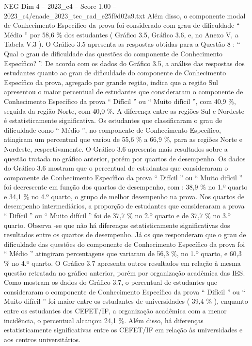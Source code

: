 \begin{textsample}{NEG Dim 4 – 2023\_c4 – Score 1.00 – 2023\_c4/enade\_2023\_tec\_rad\_e25f9d02a9.txt}
Além disso, o componente modal de Conhecimento Específico da prova foi considerado com grau de dificuldade “ Médio ” por 58,6 \% dos estudantes ( Gráfico 3.5, Gráfico 3.6, e, no Anexo V, a Tabela V.3 ).
O Gráfico 3.5 apresenta as respostas obtidas para a Questão 8 : “ Qual o grau de dificuldade das questões do componente de Conhecimento Específico? ”.
De acordo com os dados do Gráfico 3.5, a análise das respostas dos estudantes quanto ao grau de dificuldade do componente de Conhecimento Específico da prova, agregado por grande região, indica que a região Sul apresentou o maior percentual de estudantes que consideraram o componente de Conhecimento Específico da prova “ Difícil ” ou “ Muito difícil ”, com 40,9 \%, seguida da região Norte, com 40,0 \%.
A diferença entre as regiões Sul e Nordeste é estatisticamente significativa.
Os estudantes que classificaram o grau de dificuldade como “ Médio ”, no componente de Conhecimento Específico, atingiram um percentual que variou de 55,6 \% a 66,9 \%, para as regiões Norte e Nordeste, respectivamente.
O Gráfico 3.6 apresenta mais resultados sobre a questão tratada no gráfico anterior, porém por quartos de desempenho.
Os dados do Gráfico 3.6 mostram que o percentual de estudantes que consideraram o componente de Conhecimento Específico da prova “ Difícil ” ou “ Muito difícil ” foi decrescente em função dos quartos de desempenho, com : 38,9 \% no 1.º quarto e 34,1 \% no 4.º quarto, o grupo de melhor desempenho na prova.
Nos quartos de desempenho intermediários, a proporção de estudantes que consideraram a prova “ Difícil ” ou “ Muito difícil ” foi de 37,7 \% no 2.º quarto e de 37,7 \% no 3.º quarto.
Observa -se que não há diferenças estatisticamente significativas dos resultados entre os quartos de desempenho.
Já os que responderam que o grau de dificuldade das questões do componente de Conhecimento Específico da prova foi “ Médio ” atingiram percentagens que variaram de 56,3 \%, no 1.º quarto, e 60,3 \% no 4.º quarto.
O Gráfico 3.7 apresenta outros resultados em relação à mesma questão retratada no gráfico anterior, porém por organização acadêmica das IES.
Como mostram os dados do Gráfico 3.7, o percentual de estudantes que consideraram o componente de Conhecimento Específico da prova “ Difícil ” ou “ Muito difícil ” foi maior entre os estudantes de universidades ( 39,4 \% ), enquanto entre os estudantes dos CEFET/IF, a organização acadêmica com a menor incidência, o percentual alcançou 24,1 \%.
Além disso, há diferenças estatisticamente significativas entre os CEFET/IF em relação às universidades e aos centros universitários.

\end{textsample}
